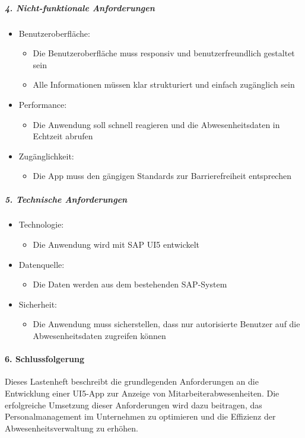 \subparagraph{4. Nicht-funktionale Anforderungen}
\begin{itemize}[noitemsep,topsep=0pt,parsep=0pt,partopsep=0pt]
    \item Benutzeroberfläche:
    \begin{itemize}
        \item Die Benutzeroberfläche muss responsiv und benutzerfreundlich gestaltet sein
        \item Alle Informationen müssen klar strukturiert und einfach zugänglich sein
    \end{itemize}
    \item Performance:
    \begin{itemize}
        \item Die Anwendung soll schnell reagieren und die Abwesenheitsdaten in Echtzeit abrufen
    \end{itemize}
    \item Zugänglichkeit:
    \begin{itemize}
        \item Die App muss den gängigen Standards zur Barrierefreiheit entsprechen
    \end{itemize}
\end{itemize}
\subparagraph{5. Technische Anforderungen}
\begin{itemize}[noitemsep,topsep=0pt,parsep=0pt,partopsep=0pt]
    \item Technologie:
    \begin{itemize}
        \item Die Anwendung wird mit SAP UI5 entwickelt
    \end{itemize}
    \item Datenquelle:
    \begin{itemize}
        \item Die Daten werden aus dem bestehenden SAP-System
    \end{itemize}
    \item Sicherheit:
    \begin{itemize}
        \item Die Anwendung muss sicherstellen, dass nur autorisierte Benutzer auf die Abwesenheitsdaten zugreifen können
    \end{itemize}
\end{itemize}
\paragraph{6. Schlussfolgerung}
Dieses Lastenheft beschreibt die grundlegenden Anforderungen an die Entwicklung einer UI5-App zur Anzeige von Mitarbeiterabwesenheiten. Die erfolgreiche Umsetzung dieser Anforderungen wird dazu beitragen, das Personalmanagement im Unternehmen zu optimieren und die Effizienz der Abwesenheitsverwaltung zu erhöhen.

